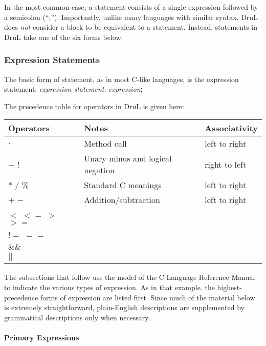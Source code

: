 In the most common case, a statement consists of a single expression followed by a semicolon (``;'').  Importantly, unlike many languages with similar syntax, DruL does \emph{not} consider a block to be equivalent to a statement.  Instead, statements in DruL take one of the six forms below.

\subsubsection{Expression Statements}

The basic form of statement, as in most C-like languages, is the expression statement: \emph{expression-statement}: \emph{expression}\textbf{;}

The precedence table for operators in DruL is given here:

\begin{tabular}{ l |l| l}
\hline\hline
Operators         & Notes                            & Associativity \\
\hline $ . $      & Method call                      & left to right \\
$-$  $!$          & Unary minus and logical negation & right to left \\
$*$ $/$ $\%$      & Standard C meanings              & left to right \\
$+$ $-$           & Addition/subtraction             & left to right \\
$<$ $<=$ $>$ $>=$ &                                  &               \\
$!=$ $==$         &                                  &               \\
$\&\&$            &                                  &               \\
$||$              &                                  &
\end{tabular}

The subsections that follow use the model of the C Language Reference Manual to indicate the various types of expression.  As in that example. the highest-precedence forms of expression are listed first.  Since much of the material below is extremely straightforward, plain-English descriptions are supplemented by grammatical descriptions only when necessary.

\paragraph{Primary Expressions}

